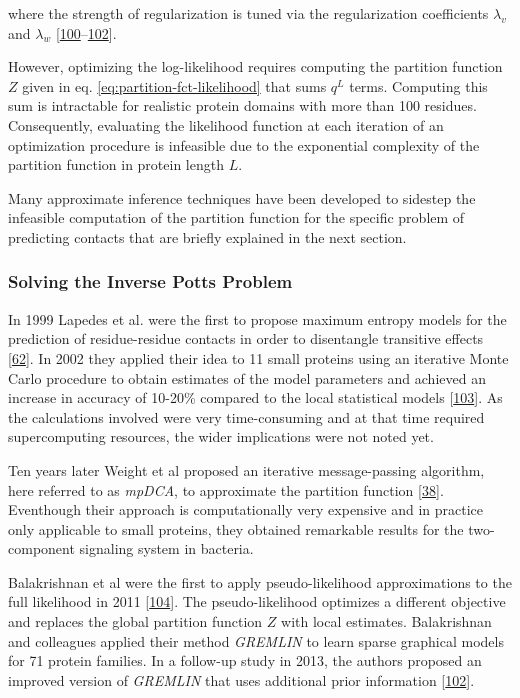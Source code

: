\documentclass[11pt,a4paper,twoside]{book}
\theoremstyle{definition}
\theoremstyle{definition}
\theoremstyle{remark}
\begin{document}
where the strength of regularization is tuned via the regularization
coefficients \(\lambda_v\) and \(\lambda_w\)
{[}\protect\hyperlink{ref-Seemayer2014}{100}--\protect\hyperlink{ref-Kamisetty2013}{102}{]}.

However, optimizing the log-likelihood requires computing the partition
function \(Z\) given in eq. \eqref{eq:partition-fct-likelihood} that sums
\(q^L\) terms. Computing this sum is intractable for realistic protein
domains with more than 100 residues. Consequently, evaluating the
likelihood function at each iteration of an optimization procedure is
infeasible due to the exponential complexity of the partition function
in protein length \(L\).

Many approximate inference techniques have been developed to sidestep
the infeasible computation of the partition function for the specific
problem of predicting contacts that are briefly explained in the next
section.

\subsubsection{Solving the Inverse Potts
Problem}\label{potts-model-solutions}

In 1999 Lapedes et al. were the first to propose maximum entropy models
for the prediction of residue-residue contacts in order to disentangle
transitive effects {[}\protect\hyperlink{ref-Lapedes1999}{62}{]}. In
2002 they applied their idea to 11 small proteins using an iterative
Monte Carlo procedure to obtain estimates of the model parameters and
achieved an increase in accuracy of 10-20\% compared to the local
statistical models {[}\protect\hyperlink{ref-Lapedes2012a}{103}{]}. As
the calculations involved were very time-consuming and at that time
required supercomputing resources, the wider implications were not noted
yet.

Ten years later Weight et al proposed an iterative message-passing
algorithm, here referred to as \emph{mpDCA}, to approximate the
partition function {[}\protect\hyperlink{ref-Weigt2009}{38}{]}.
Eventhough their approach is computationally very expensive and in
practice only applicable to small proteins, they obtained remarkable
results for the two-component signaling system in bacteria.

Balakrishnan et al were the first to apply pseudo-likelihood
approximations to the full likelihood in 2011
{[}\protect\hyperlink{ref-Balakrishnan2011}{104}{]}. The
pseudo-likelihood optimizes a different objective and replaces the
global partition function \(Z\) with local estimates. Balakrishnan and
colleagues applied their method \emph{GREMLIN} to learn sparse graphical
models for 71 protein families. In a follow-up study in 2013, the
authors proposed an improved version of \emph{GREMLIN} that uses
additional prior information
{[}\protect\hyperlink{ref-Kamisetty2013}{102}{]}.
\end{document}
